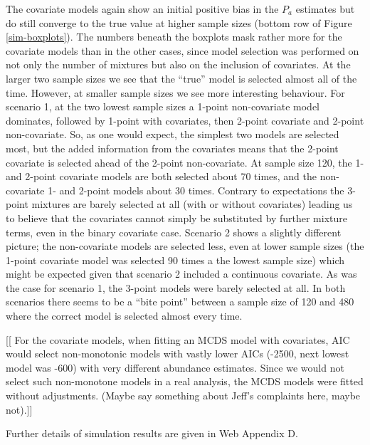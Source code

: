 \documentclass[useAMS,referee]{biom}
\begin{document}
The covariate models again show an initial positive bias in the $P_a$ estimates but do still converge to the true value at higher sample sizes (bottom row of Figure \ref{sim-boxplots}). The numbers beneath the boxplots mask rather more for the covariate models than in the other cases, since model selection was performed on not only the number of mixtures but also on the inclusion of covariates. At the larger two sample sizes we see that the ``true'' model is selected almost all of the time. However,  at smaller sample sizes we see more interesting behaviour. For scenario 1, at the two lowest sample sizes a 1-point non-covariate model dominates, followed by 1-point with covariates, then 2-point covariate and 2-point non-covariate. So, as one would expect, the simplest two models are selected most, but the added information from the covariates means that the 2-point covariate is selected ahead of the 2-point non-covariate. At sample size 120, the 1- and 2-point covariate models are both selected about 70 times, and the non-covariate 1- and 2-point models about 30 times. Contrary to expectations the 3-point mixtures are barely selected at all (with or without covariates) leading us to believe that the covariates cannot simply be substituted by further mixture terms, even in the binary covariate case. Scenario 2 shows a slightly different picture; the non-covariate models are selected less, even at lower sample sizes (the 1-point covariate model was selected 90 times a the lowest sample size) which might be expected given that scenario 2 included a continuous covariate. As was the case for scenario 1, the 3-point models were barely selected at all. In both scenarios there seems to be a ``bite point'' between a sample size of 120 and 480 where the correct model is selected almost every time.

[[ For the covariate models, when fitting an MCDS model with covariates, AIC would select non-monotonic models with vastly lower AICs (-2500, next lowest model was -600) with very different abundance estimates. Since we would not select such non-monotone models in a real analysis, the MCDS models were fitted without adjustments. (Maybe say something about Jeff's complaints here, maybe not).]]


Further details of simulation results are given in Web Appendix D.
\end{document}
